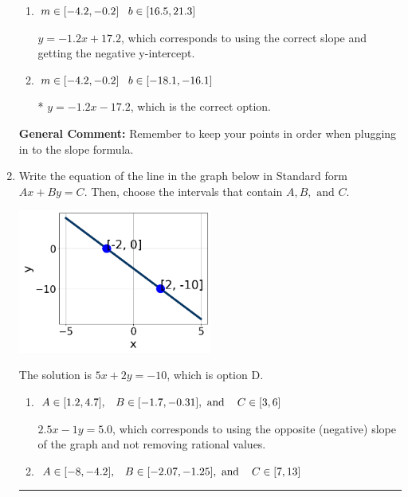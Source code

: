 \documentclass{extbook}[14pt]
\newcommand{\litem}[1]{\item #1

\rule{\textwidth}{0.4pt}}
\begin{document}
\begin{enumerate}
{\begin{enumerate}[label=\Alph*.]
 $y = -1.2x + 7$, which corresponds to using the correct slope/equation but not distributing correctly using the first point.
\item \( m \in [-4.2, -0.2] \hspace*{3mm} b \in [16.5, 21.3] \)

 $y = -1.2x + 17.2$, which corresponds to using the correct slope and getting the negative y-intercept.
\item \( m \in [-4.2, -0.2] \hspace*{3mm} b \in [-18.1, -16.1] \)

* $y = -1.2x -17.2$, which is the correct option.
\end{enumerate}

\textbf{General Comment:} Remember to keep your points in order when plugging in to the slope formula.
}
\litem{
Write the equation of the line in the graph below in Standard form $Ax+By=C$. Then, choose the intervals that contain $A, B, \text{ and } C$.

\begin{center}
    \includegraphics[width=0.5\textwidth]{../Figures/linearGraphToStandardCopyC.png}
\end{center}




The solution is \( 5x + 2y = -10 \), which is option D.\begin{enumerate}[label=\Alph*.]
\item \( A \in [1.2, 4.7], \hspace{3mm} B \in [-1.7, -0.31], \text{ and } \hspace{3mm} C \in [3, 6] \)

 $2.5x - 1y = 5.0$, which corresponds to using the opposite (negative) slope of the graph and not removing rational values.
\item \( A \in [-8, -4.2], \hspace{3mm} B \in [-2.07, -1.25], \text{ and } \hspace{3mm} C \in [7, 13] \)


\end{enumerate}}
\end{enumerate}
\end{document}
